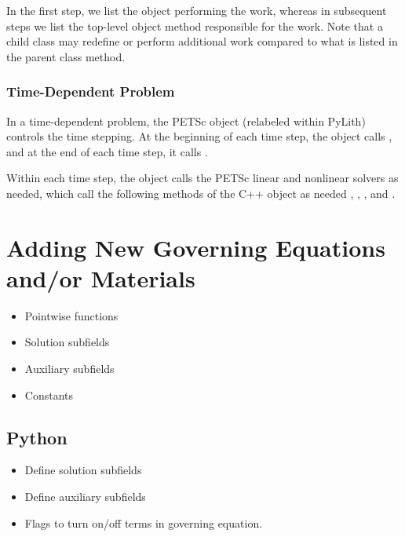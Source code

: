 In the first step, we list the object performing the work, whereas in
subsequent steps we list the top-level object method responsible for
the work. Note that a child class may redefine or perform additional
work compared to what is listed in the parent class method.

\subsubsection{Time-Dependent Problem}

In a time-dependent problem, the PETSc  object (relabeled
 within PyLith) controls the time stepping. At the
beginning of each time step, the  object calls
, and at the end of each
time step, it calls .

Within each time step, the  object calls the PETSc
linear and nonlinear solvers as needed, which call the following
methods of the C++  object as
needed
,
,
, and
.

\section{Adding New Governing Equations and/or Materials}


\begin{itemize}
\item Pointwise functions
\item Solution subfields
\item Auxiliary subfields
\item Constants
\end{itemize}

\subsection{Python}

\begin{itemize}
\item Define solution subfields
\item Define auxiliary subfields
\item Flags to turn on/off terms in governing equation.
\end{itemize}

